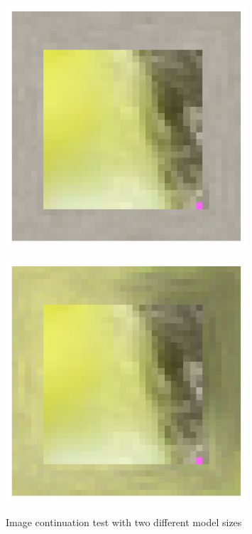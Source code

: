 \begin{itemize}
        \begin{figure}[H]
            \centering
            \begin{minipage}{0.48\textwidth}
                \centering
                \includegraphics[width=0.8\textwidth]{imgs/ImageTest_5.0.1.0_small.png} 
                \label{fig:test2_1_M4_SIT}
            \end{minipage}
            \hfill
            \begin{minipage}{0.48\textwidth}
                \centering
                \includegraphics[width=0.8\textwidth]{imgs/ImageTest_5.0.1.0_big.png} 
                \label{fig:test2_2_M5_SIT}
            \end{minipage}
            \caption{Image continuation test with two different model sizes}
            \label{fig:test2_result_SIT}
        \end{figure}
        

\end{itemize}
